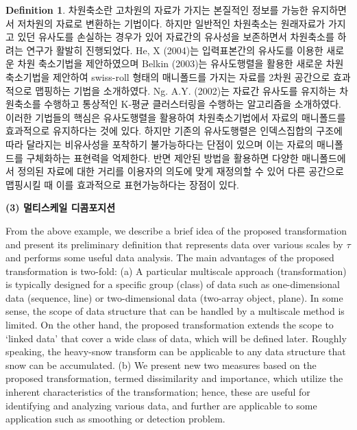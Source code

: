 \documentclass[preprint, review, 12pt]{article}
\theoremstyle{definition}
\newtheorem{dfn}{Definition}
\theoremstyle{remark}
\begin{document}
\begin{dfn}
차원축소란 고차원의 자료가 가지는 본질적인 정보를 가능한 유지하면서 저차원의 자료로 변환하는 기법이다. 하지만 일반적인 차원축소는 원래자료가 가지고 있던 유사도를 손실하는 경우가 있어 자료간의 유사성을 보존하면서 차원축소를 하려는 연구가 활발히 진행되었다. He, X (2004)는 입력표본간의 유사도를 이용한 새로운 차원 축소기법을 제안하였으며 Belkin (2003)는 유사도행렬을 활용한 새로운 차원축소기법을 제안하여 swiss-roll 형태의 매니폴드를 가지는 자료를 2차원 공간으로 효과적으로 맵핑하는 기법을 소개하였다. Ng. A.Y. (2002)는 자료간 유사도를 유지하는 차원축소를 수행하고 통상적인 K-평균 클러스터링을 수행하는 알고리즘을 소개하였다. 이러한 기법들의 핵심은 유사도행렬을 활용하여 차원축소기법에서 자료의 매니폴드를 효과적으로 유지하다는 것에 있다. 하지만 기존의 유사도행렬은 인덱스집합의 구조에 따라 달라지는 비유사성을 포착하기 불가능하다는 단점이 있으며 이는 자료의 매니폴드를 구체화하는 표현력을 억제한다. 반면 제안된 방법을 활용하면 다양한 매니폴드에서 정의된 자료에 대한 거리를 이용자의 의도에 맞게 재정의할 수 있어 다른 공간으로 맵핑시킬 때 이를 효과적으로 표현가능하다는 장점이 있다.

\noindent\textbf{(3) 멀티스케일 디콤포지션} 

From the above example, we describe a brief idea of the proposed transformation and present its preliminary definition that represents data over various scales by $\tau$ and performs some useful data analysis. The main advantages of the proposed transformation is two-fold: (a)  A particular multiscale approach (transformation) is typically designed for a specific group (class) of data such as one-dimensional data (sequence, line) or two-dimensional data (two-array object, plane). In some sense, the scope of data structure that can be handled by a multiscale method is limited. On the other hand, the proposed transformation extends the scope to `linked data' that cover a wide class of data, which will be defined later. Roughly speaking, the heavy-snow transform can be applicable to any data structure that snow can be accumulated. (b) We present new two measures based on the proposed transformation, termed dissimilarity and importance, which utilize the inherent characteristics of the transformation; hence, these are useful for identifying and analyzing various data, and  further are applicable to some application such as smoothing or detection problem.   


\end{dfn}
\end{document}
